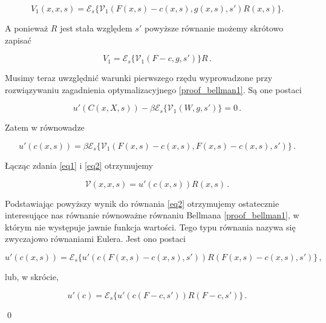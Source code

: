 \begin{equation*}
V_1 (x,x,s) =  \mathcal{E}_s \bigl \{ \mathcal{V}_1 (F(x,s) - c(x,s), g(x,s), s')R(x,s)\bigl \}. 
\end{equation*}

A ponieważ $ R $ jest stała względem $ s' $ powyższe równanie możemy skrótowo zapisać

\begin{equation}\label{eq1}
V_1 = \mathcal{E}_s \bigl \{ \mathcal{V}_1 (F - c, g, s')\bigl \}R \,.
\end{equation}

Musimy teraz uwzględnić warunki pierwszego rzędu wyprowadzone przy rozwiązywaniu zagadnienia optymalizacyjnego \ref{proof_bellman1}. Są one postaci

\begin{equation*}
u'(C(x,X,s)) - \beta \mathcal{E}_s \bigl \{ \mathcal{V}_1 (W, g, s') \bigl \} = 0 \,.
\end{equation*}

Zatem w równowadze

\begin{equation}\label{eq2}
u'(c(x,s)) = \beta \mathcal{E}_s \bigl \{ \mathcal{V}_1 (F(x,s)-c(x,s), F(x,s)-c(x,s), s') \bigl \} \,.
\end{equation}

Łącząc zdania \ref{eq1} i \ref{eq2} otrzymujemy

\begin{equation*}
\mathcal{V}(x,x,s) = u'(c(x,s))R(x,s) \,.
\end{equation*}

Podstawiając powyższy wynik do równania \ref{eq2} otrzymujemy ostatecznie interesujące nas równanie równoważne równaniu Bellmana \ref{proof_bellman1}, w którym nie występuje jawnie funkcja wartości. Tego typu równania nazywa się zwyczajowo równaniami Eulera. Jest ono postaci

\begin{equation*}
u'(c(x,s)) =   \mathcal{E}_s \bigl \{ u'(c(F(x,s)-c(x,s),s'))R(F(x,s)-c(x,s),s')	\bigl \} \,,
\end{equation*}

lub, w skrócie,

\begin{equation*}
u'(c) =   \mathcal{E}_s \bigl \{ u'(c(F-c, s'))R(F-c,s')	\bigl \} \,.
\end{equation*}

\qed
\newpage


